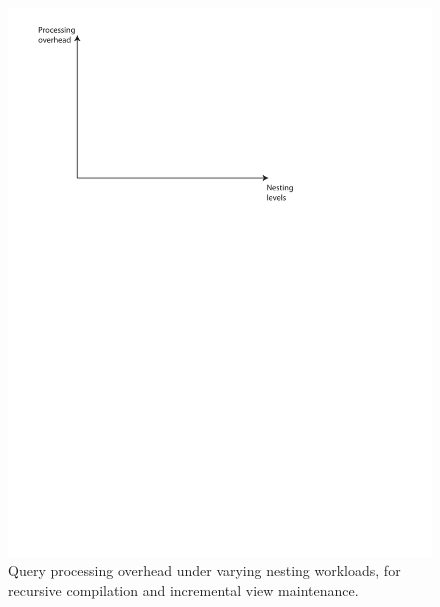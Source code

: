 {\begin{figure}
\includegraphics[scale=0.6]{figures/axes-nlevels.pdf}
\caption{Query processing overhead under varying nesting workloads, for
recursive compilation and incremental view maintenance.}
\label{fig:overhead-workload-nesting}
\end{figure}

}
